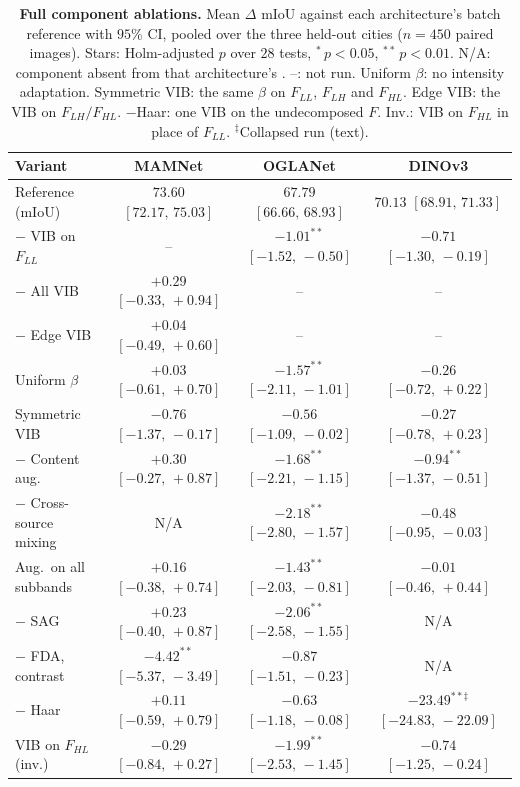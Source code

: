 \begin{table}[h]
\centering
\footnotesize
\setlength{\tabcolsep}{3pt}
\caption{\textbf{Full \sib{} component ablations.} Mean $\Delta$ mIoU against each architecture's batch reference with $95\%$ CI, pooled over the three held-out cities ($n = 450$ paired images). Stars: Holm-adjusted $p$ over $28$ tests, $^{*}\,p<0.05$, $^{**}\,p<0.01$. N/A: component absent from that architecture's \sib{}. --: not run. Uniform $\beta$: no intensity adaptation. Symmetric VIB: the same $\beta$ on $F_{LL}$, $F_{LH}$ and $F_{HL}$. Edge VIB: the VIB on $F_{LH}/F_{HL}$. $-$Haar: one VIB on the undecomposed $F$. Inv.: VIB on $F_{HL}$ in place of $F_{LL}$. $^{\ddagger}$Collapsed run (text).}
\label{tab:sib-ablations-full}
\begin{tabular}{l|ccc}
\toprule
\textbf{Variant} & \textbf{MAMNet} & \textbf{OGLANet} & \textbf{DINOv3} \\
\midrule
Reference (mIoU) & $73.60$ {\scriptsize$[72.17,\,75.03]$} & $67.79$ {\scriptsize$[66.66,\,68.93]$} & $70.13$ {\scriptsize$[68.91,\,71.33]$} \\
\midrule
$-$ VIB on $F_{LL}$ & -- & $-1.01^{**}$ {\scriptsize$[-1.52,\,-0.50]$} & $-0.71$ {\scriptsize$[-1.30,\,-0.19]$} \\
$-$ All VIB & $+0.29$ {\scriptsize$[-0.33,\,+0.94]$} & -- & -- \\
$-$ Edge VIB & $+0.04$ {\scriptsize$[-0.49,\,+0.60]$} & -- & -- \\
Uniform $\beta$ & $+0.03$ {\scriptsize$[-0.61,\,+0.70]$} & $-1.57^{**}$ {\scriptsize$[-2.11,\,-1.01]$} & $-0.26$ {\scriptsize$[-0.72,\,+0.22]$} \\
Symmetric VIB & $-0.76$ {\scriptsize$[-1.37,\,-0.17]$} & $-0.56$ {\scriptsize$[-1.09,\,-0.02]$} & $-0.27$ {\scriptsize$[-0.78,\,+0.23]$} \\
$-$ Content aug. & $+0.30$ {\scriptsize$[-0.27,\,+0.87]$} & $-1.68^{**}$ {\scriptsize$[-2.21,\,-1.15]$} & $-0.94^{**}$ {\scriptsize$[-1.37,\,-0.51]$} \\
$-$ Cross-source mixing & N/A & $-2.18^{**}$ {\scriptsize$[-2.80,\,-1.57]$} & $-0.48$ {\scriptsize$[-0.95,\,-0.03]$} \\
Aug.\ on all subbands & $+0.16$ {\scriptsize$[-0.38,\,+0.74]$} & $-1.43^{**}$ {\scriptsize$[-2.03,\,-0.81]$} & $-0.01$ {\scriptsize$[-0.46,\,+0.44]$} \\
$-$ SAG & $+0.23$ {\scriptsize$[-0.40,\,+0.87]$} & $-2.06^{**}$ {\scriptsize$[-2.58,\,-1.55]$} & N/A \\
$-$ FDA, contrast & $-4.42^{**}$ {\scriptsize$[-5.37,\,-3.49]$} & $-0.87$ {\scriptsize$[-1.51,\,-0.23]$} & N/A \\
$-$ Haar & $+0.11$ {\scriptsize$[-0.59,\,+0.79]$} & $-0.63$ {\scriptsize$[-1.18,\,-0.08]$} & $-23.49^{**\ddagger}$ {\scriptsize$[-24.83,\,-22.09]$} \\
VIB on $F_{HL}$ (inv.) & $-0.29$ {\scriptsize$[-0.84,\,+0.27]$} & $-1.99^{**}$ {\scriptsize$[-2.53,\,-1.45]$} & $-0.74$ {\scriptsize$[-1.25,\,-0.24]$} \\
\bottomrule
\end{tabular}
\end{table}

